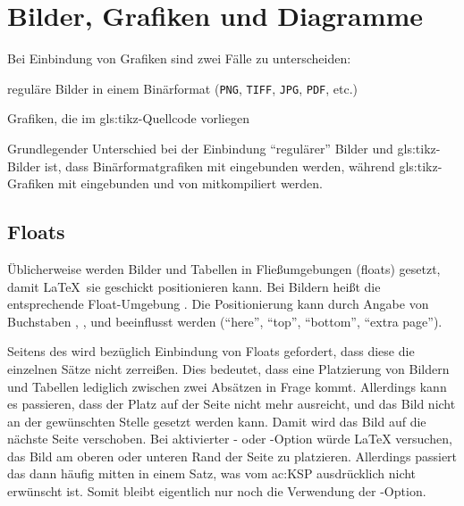 \section[Bilder, Grafiken und Diagramme]{Bilder, Grafiken und Diagramme}
\label{sec:Bilder}
%
Bei Einbindung von Grafiken sind zwei Fälle zu unterscheiden:
\begin{itemize*}
  \item reguläre Bilder in einem Binärformat
	      (\texttt{PNG}, \texttt{TIFF}, \texttt{JPG}, \texttt{PDF}, etc.)
	\item {}Grafiken, die im \gls{gls:tikz}-Quellcode vorliegen 
\end{itemize*}

Grundlegender Unterschied bei der Einbindung \enquote{regulärer} Bilder
und \gls{gls:tikz}-Bilder ist, dass Binärformatgrafiken mit
 eingebunden werden,
während \gls{gls:tikz}-Grafiken mit 
eingebunden und von  mitkompiliert werden.


\subsection[Floats]{Floats}%
\label{sec:Floats}
%
Üblicherweise werden Bilder und Tabellen in Fließumgebungen (floats) gesetzt,
damit \LaTeX\ sie geschickt positionieren kann.
Bei Bildern heißt die entsprechende Float-Umgebung .
Die Positionierung kann durch Angabe von Buchstaben
, ,  und 
beeinflusst werden
(\enquote{here}, \enquote{top}, \enquote{bottom}, \enquote{extra page}).

Seitens des  wird bezüglich Einbindung von Floats gefordert,
dass diese die einzelnen Sätze nicht zerreißen.
Dies bedeutet, dass eine Platzierung von Bildern und Tabellen lediglich
zwischen zwei Absätzen in Frage kommt.
Allerdings kann es passieren, dass der Platz auf der Seite nicht mehr ausreicht,
und das Bild nicht an der gewünschten Stelle gesetzt werden kann.
Damit wird das Bild auf die nächste Seite verschoben.
Bei aktivierter - oder -Option würde \LaTeX{} versuchen,
das Bild am oberen oder unteren Rand der Seite zu platzieren.
Allerdings passiert das dann häufig mitten in einem Satz,
was vom \gls{ac:KSP} ausdrücklich nicht erwünscht ist.
Somit bleibt eigentlich nur noch die Verwendung der -Option.

